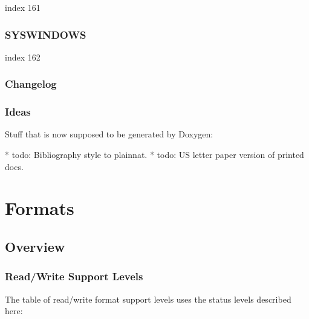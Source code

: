 \documentclass[a4paper]{report}
\begin{document}
index 161

\subsection{SYSWINDOWS}

index 162


\subsection{Changelog}

\subsection{Ideas}

Stuff that is now supposed to be generated by Doxygen:

* todo: Bibliography style to plainnat.
* todo: US letter paper version of printed docs.

\chapter{Formats}

\section{Overview}

\subsection{Read/Write Support Levels}

The table of read/write format support levels uses the status levels described here:
\end{document}
